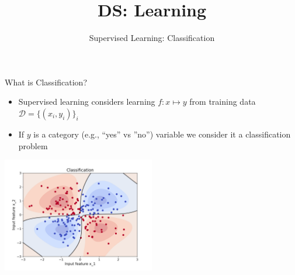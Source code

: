 \documentclass[aspectratio=169]{../latex_main/tntbeamer}  %
\title[Classification]{DS: Learning}
\subtitle{Supervised Learning: Classification}
\begin{document}
	
    \maketitle
    
    \begin{frame}[c]{What is Classification?}
        \begin{itemize}
            \item Supervised learning considers learning $f: x \mapsto y$ from training data $\mathcal{D}= \{(x_i,y_i)\}_{i}$ 
            \item If $y$ is a category (e.g., ``yes'' vs ''no'') variable we consider it a classification problem
        \end{itemize} 

        \centering
        \includegraphics[width=0.5\textwidth]{figure/nonlinear_classification}

    
    
    
    
    
    

    \end{frame}
\end{document}

